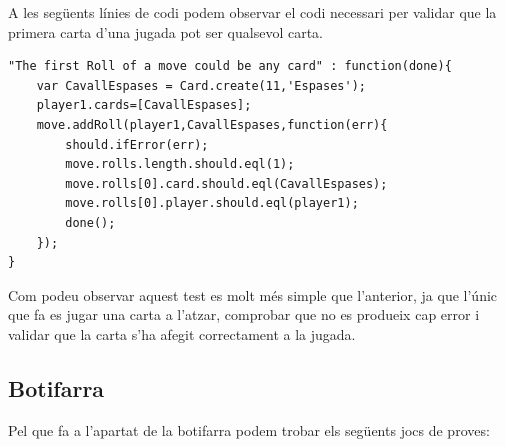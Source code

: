 A les següents línies de codi podem observar el codi necessari per validar que la primera carta d'una jugada pot ser qualsevol carta.

\begin{lstlisting}
"The first Roll of a move could be any card" : function(done){
    var CavallEspases = Card.create(11,'Espases');
    player1.cards=[CavallEspases];
    move.addRoll(player1,CavallEspases,function(err){
        should.ifError(err);
        move.rolls.length.should.eql(1);
        move.rolls[0].card.should.eql(CavallEspases);
        move.rolls[0].player.should.eql(player1);
        done();
    });
}
\end{lstlisting}

Com podeu observar aquest test es molt més simple que l'anterior, ja que l'únic que fa es jugar una carta a l'atzar, comprobar que no es produeix cap error i validar que la carta s'ha afegit correctament a la jugada.

\subsection{Botifarra}

Pel que fa a l'apartat de la botifarra podem trobar els següents jocs de proves:


